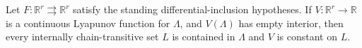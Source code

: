 Let \(F:\mathbb R^r\rightrightarrows\mathbb R^r\) satisfy the standing differential-inclusion hypotheses. If \(V:\mathbb R^r\to\mathbb R\) is a continuous Lyapunov function for \(\Lambda\), and \(V(\Lambda)\) has empty interior, then every internally chain-transitive set \(L\) is contained in \(\Lambda\) and \(V\) is constant on \(L\).